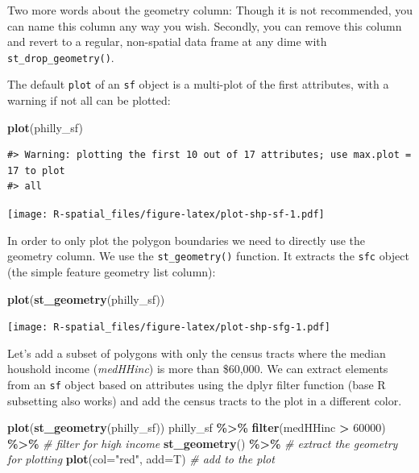 \documentclass[
]{book}
\newenvironment{Shaded}{\begin{snugshade}}{\end{snugshade}}
\newcommand{\AttributeTok}[1]{\textcolor[rgb]{0.13,0.29,0.53}{#1}}
\newcommand{\CommentTok}[1]{\textcolor[rgb]{0.56,0.35,0.01}{\textit{#1}}}
\newcommand{\DecValTok}[1]{\textcolor[rgb]{0.00,0.00,0.81}{#1}}
\newcommand{\FunctionTok}[1]{\textcolor[rgb]{0.13,0.29,0.53}{\textbf{#1}}}
\newcommand{\NormalTok}[1]{#1}
\newcommand{\SpecialCharTok}[1]{\textcolor[rgb]{0.81,0.36,0.00}{\textbf{#1}}}
\newcommand{\StringTok}[1]{\textcolor[rgb]{0.31,0.60,0.02}{#1}}
\begin{document}
Two more words about the geometry column: Though it is not recommended, you can name this column any way you wish. Secondly, you can remove this column and revert to a regular, non-spatial data frame at any dime with \texttt{st\_drop\_geometry()}.

The default \texttt{plot} of an \texttt{sf} object is a multi-plot of the first attributes, with a warning if not all can be plotted:

\begin{Shaded}
\begin{Highlighting}[]
\FunctionTok{plot}\NormalTok{(philly\_sf)}
\end{Highlighting}
\end{Shaded}

\begin{verbatim}
#> Warning: plotting the first 10 out of 17 attributes; use max.plot = 17 to plot
#> all
\end{verbatim}

\texttt{[image: R-spatial\_files/figure-latex/plot-shp-sf-1.pdf]}

In order to only plot the polygon boundaries we need to directly use the geometry column. We use the \texttt{st\_geometry()} function. It extracts the \texttt{sfc} object (the simple feature geometry list column):

\begin{Shaded}
\begin{Highlighting}[]
\FunctionTok{plot}\NormalTok{(}\FunctionTok{st\_geometry}\NormalTok{(philly\_sf))}
\end{Highlighting}
\end{Shaded}

\texttt{[image: R-spatial\_files/figure-latex/plot-shp-sfg-1.pdf]}

Let's add a subset of polygons with only the census tracts where the median houshold income (\emph{medHHinc}) is more than \$60,000. We can extract elements from an \texttt{sf} object based on attributes using the dplyr filter function (base R subsetting also works) and add the census tracts to the plot in a different color.

\begin{Shaded}
\begin{Highlighting}[]
\FunctionTok{plot}\NormalTok{(}\FunctionTok{st\_geometry}\NormalTok{(philly\_sf))}
\NormalTok{philly\_sf }\SpecialCharTok{\%\textgreater{}\%} 
  \FunctionTok{filter}\NormalTok{(medHHinc }\SpecialCharTok{\textgreater{}} \DecValTok{60000}\NormalTok{) }\SpecialCharTok{\%\textgreater{}\%} \CommentTok{\# filter for high income}
  \FunctionTok{st\_geometry}\NormalTok{() }\SpecialCharTok{\%\textgreater{}\%} \CommentTok{\# extract the geometry for plotting}
  \FunctionTok{plot}\NormalTok{(}\AttributeTok{col=}\StringTok{"red"}\NormalTok{, }\AttributeTok{add=}\NormalTok{T) }\CommentTok{\# add to the plot}
\end{Highlighting}
\end{Shaded}
\end{document}
